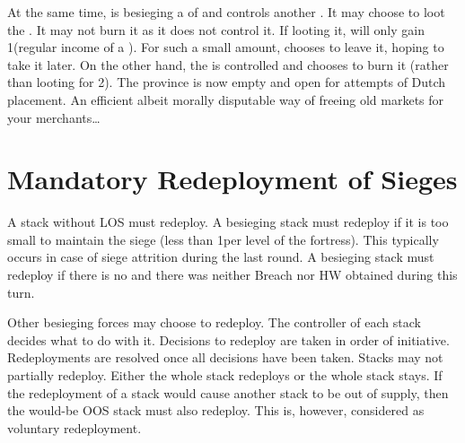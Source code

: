 \begin{exemple}[Burning \TP]
  At the same time, \HOL is besieging a \TP\Facemoins of \paysPortugal and
  controls another \TP\Faceplus. It may choose to loot the \TP\Facemoins. It
  may not burn it as it does not control it. If looting it, \HOL will only
  gain 1\ducats (regular income of a \TP\Facemoins). For such a small amount,
  \HOL chooses to leave it, hoping to take it later. On the other hand, the
  \TP\Faceplus is controlled and \HOL chooses to burn it (rather than looting
  for 2\ducats). The province is now empty and open for attempts of Dutch \TP
  placement. An efficient albeit morally disputable way of freeing old markets
  for your merchants\ldots
\end{exemple}

\section{Mandatory Redeployment of Sieges}\label{chRedep:Redeployment}
\bparag A stack without LOS must redeploy.
\bparag A besieging stack must redeploy if it is too small to maintain the
siege (less than 1\LD per level of the fortress). This typically occurs in
case of siege attrition during the last round.
\bparag A besieging stack must redeploy if there is no \USURE\Faceplus and
there was neither Breach nor HW obtained during this turn.

\bparag Other besieging forces may choose to redeploy. The controller of each
stack decides what to do with it.
\bparag Decisions to redeploy are taken in order of initiative. Redeployments
are resolved once all decisions have been taken.
\bparag Stacks may not partially redeploy. Either the whole stack redeploys or
the whole stack stays.
\bparag If the redeployment of a stack would cause another stack to be out of
supply, then the would-be OOS stack must also redeploy. This is, however,
considered as voluntary redeployment.

